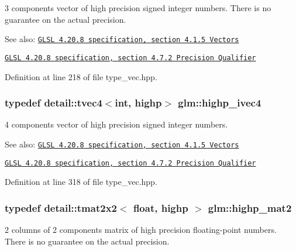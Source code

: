 3 components vector of high precision signed integer numbers. There is no guarantee on the actual precision.

\begin{Desc}
\item[See also:]\href{http://www.opengl.org/registry/doc/GLSLangSpec.4.20.8.pdf}{\tt GLSL 4.20.8 specification, section 4.1.5 Vectors} 

\href{http://www.opengl.org/registry/doc/GLSLangSpec.4.20.8.pdf}{\tt GLSL 4.20.8 specification, section 4.7.2 Precision Qualifier} \end{Desc}


Definition at line 218 of file type\_\-vec.hpp.\hypertarget{group__core__precision_geba08fcf78aeae954c3335d73500ff8b}{
\subsubsection[highp\_\-ivec4]{\setlength{\rightskip}{0pt plus 5cm}typedef detail::tvec4$<$int, highp$>$ {\bf glm::highp\_\-ivec4}}}
\label{group__core__precision_geba08fcf78aeae954c3335d73500ff8b}


4 components vector of high precision signed integer numbers.

\begin{Desc}
\item[See also:]\href{http://www.opengl.org/registry/doc/GLSLangSpec.4.20.8.pdf}{\tt GLSL 4.20.8 specification, section 4.1.5 Vectors} 

\href{http://www.opengl.org/registry/doc/GLSLangSpec.4.20.8.pdf}{\tt GLSL 4.20.8 specification, section 4.7.2 Precision Qualifier} \end{Desc}


Definition at line 318 of file type\_\-vec.hpp.\hypertarget{group__core__precision_gb9884251d84b95dbbf27aa1e4b3a1ec7}{
\subsubsection[highp\_\-mat2]{\setlength{\rightskip}{0pt plus 5cm}typedef detail::tmat2x2$<$ float, highp $>$ {\bf glm::highp\_\-mat2}}}
\label{group__core__precision_gb9884251d84b95dbbf27aa1e4b3a1ec7}


2 columns of 2 components matrix of high precision floating-point numbers. There is no guarantee on the actual precision.

